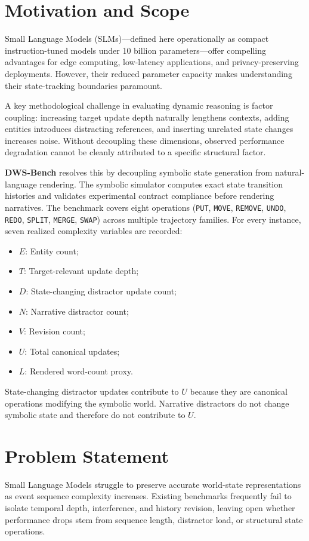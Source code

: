 \documentclass{iutbscthesis}
\begin{document}
\section{Motivation and Scope}
Small Language Models (SLMs)—defined here operationally as compact instruction-tuned models under 10 billion parameters—offer compelling advantages for edge computing, low-latency applications, and privacy-preserving deployments. However, their reduced parameter capacity makes understanding their state-tracking boundaries paramount.

A key methodological challenge in evaluating dynamic reasoning is factor coupling: increasing target update depth naturally lengthens contexts, adding entities introduces distracting references, and inserting unrelated state changes increases noise. Without decoupling these dimensions, observed performance degradation cannot be cleanly attributed to a specific structural factor.

\textbf{DWS-Bench} resolves this by decoupling symbolic state generation from natural-language rendering. The symbolic simulator computes exact state transition histories and validates experimental contract compliance before rendering narratives. The benchmark covers eight operations (\texttt{PUT}, \texttt{MOVE}, \texttt{REMOVE}, \texttt{UNDO}, \texttt{REDO}, \texttt{SPLIT}, \texttt{MERGE}, \texttt{SWAP}) across multiple trajectory families. For every instance, seven realized complexity variables are recorded:
\begin{itemize}[noitemsep]
    \item $E$: Entity count;
    \item $T$: Target-relevant update depth;
    \item $D$: State-changing distractor update count;
    \item $N$: Narrative distractor count;
    \item $V$: Revision count;
    \item $U$: Total canonical updates;
    \item $L$: Rendered word-count proxy.
\end{itemize}

State-changing distractor updates contribute to $U$ because they are canonical operations modifying the symbolic world. Narrative distractors do not change symbolic state and therefore do not contribute to $U$.

\section{Problem Statement}
Small Language Models struggle to preserve accurate world-state representations as event sequence complexity increases. Existing benchmarks frequently fail to isolate temporal depth, interference, and history revision, leaving open whether performance drops stem from sequence length, distractor load, or structural state operations.
\end{document}
